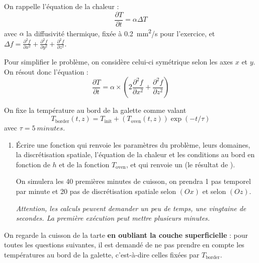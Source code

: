 \documentclass{article}
\newcommand{\paren}[1]{\ensuremath{\left(#1\right)}}
\begin{document}
On rappelle l'équation de la chaleur :
\[\frac{\partial T}{\partial t} = \alpha\Delta T\]
avec $\alpha$ la diffusivité thermique, fixée à \qty{0.2}{mm^2/s} pour l'exercice, et $\Delta f = \frac{\partial^2f}{\partial x^2} + \frac{\partial^2f}{\partial y^2} + \frac{\partial^2f}{\partial z^2}$.

Pour simplifier le problème, on considère celui-ci symétrique selon les axes $x$ et $y$. On résout donc l'équation :
\[\frac{\partial T}{\partial t} = \alpha\times\paren{2\frac{\partial^2f}{\partial x^2} + \frac{\partial^2f}{\partial z^2}}\]


On fixe la température au bord de la galette comme valant
\[T_{\text{border}}(t, z) = T_{\text{init}} + \paren{T_{\text{oven}}(t, z)}\exp\paren{-t/\tau}\] avec $\tau = \qty{5}{minutes}$.

\begin{enumerate}
	\item Écrire une fonction qui renvoie les paramètres du problème, leurs domaines, la discrétisation spatiale, l'équation de la chaleur et les conditions au bord en fonction de $h$ et de la fonction $T_{\text{oven}}$, et qui renvoie un  (le résultat de ).
	
	On simulera les 40 premières minutes de cuisson, on prendra 1 pas temporel par minute et 20 pas de discrétisation spatiale selon $(Ox)$ et selon $(Oz)$.
	
	\textit{Attention, les calculs peuvent demander un peu de temps, une vingtaine de secondes. La première exécution peut mettre plusieurs minutes.}
\end{enumerate}

On regarde la cuisson de la tarte \textbf{en oubliant la couche superficielle} : pour toutes les questions suivantes, il est demandé de ne pas prendre en compte les températures au bord de la galette, c'est-à-dire celles fixées par $T_{\text{border}}$.
\end{document}
